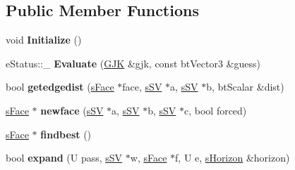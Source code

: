 \subsection*{Public Member Functions}
\begin{DoxyCompactItemize}
\item 
\mbox{\label{structgjkepa2__impl_1_1EPA_a5f6c9f49dd9fcd223aba906afa1dad7f}} 
void {\bfseries Initialize} ()
\item 
\mbox{\label{structgjkepa2__impl_1_1EPA_a66edbc762eb8ac621d32f4620a5dfc35}} 
e\+Status\+::\+\_\+ {\bfseries Evaluate} (\hyperlink{structgjkepa2__impl_1_1GJK}{G\+JK} \&gjk, const bt\+Vector3 \&guess)
\item 
\mbox{\label{structgjkepa2__impl_1_1EPA_af1bbe833b095a7ff62fa6ca969f22e16}} 
bool {\bfseries getedgedist} (\hyperlink{structgjkepa2__impl_1_1EPA_1_1sFace}{s\+Face} $\ast$face, \hyperlink{structgjkepa2__impl_1_1GJK_1_1sSV}{s\+SV} $\ast$a, \hyperlink{structgjkepa2__impl_1_1GJK_1_1sSV}{s\+SV} $\ast$b, bt\+Scalar \&dist)
\item 
\mbox{\label{structgjkepa2__impl_1_1EPA_ac01d46e7801045987e4c7b46f6d08e1d}} 
\hyperlink{structgjkepa2__impl_1_1EPA_1_1sFace}{s\+Face} $\ast$ {\bfseries newface} (\hyperlink{structgjkepa2__impl_1_1GJK_1_1sSV}{s\+SV} $\ast$a, \hyperlink{structgjkepa2__impl_1_1GJK_1_1sSV}{s\+SV} $\ast$b, \hyperlink{structgjkepa2__impl_1_1GJK_1_1sSV}{s\+SV} $\ast$c, bool forced)
\item 
\mbox{\label{structgjkepa2__impl_1_1EPA_a906d2b41e82262cc702fedac99e88906}} 
\hyperlink{structgjkepa2__impl_1_1EPA_1_1sFace}{s\+Face} $\ast$ {\bfseries findbest} ()
\item 
\mbox{\label{structgjkepa2__impl_1_1EPA_a279ea2052f9a7bfc3a1bd5024bb6ad17}} 
bool {\bfseries expand} (U pass, \hyperlink{structgjkepa2__impl_1_1GJK_1_1sSV}{s\+SV} $\ast$w, \hyperlink{structgjkepa2__impl_1_1EPA_1_1sFace}{s\+Face} $\ast$f, U e, \hyperlink{structgjkepa2__impl_1_1EPA_1_1sHorizon}{s\+Horizon} \&horizon)
\end{DoxyCompactItemize}
